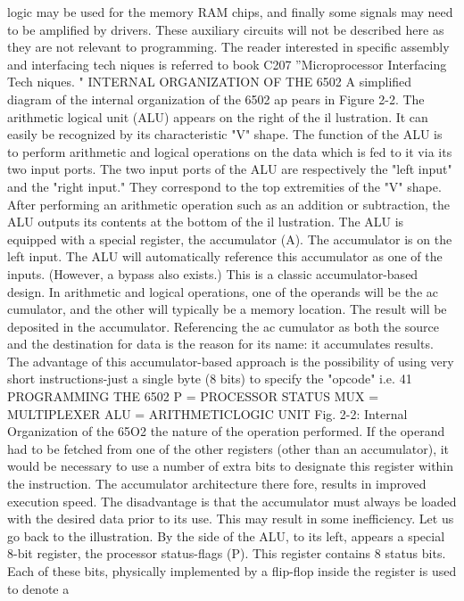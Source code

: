 \documentclass{book}
\begin{document}
logic may be used for the memory RAM chips, and finally some
signals may need to be amplified by drivers. These auxiliary circuits
will not be described here as they are not relevant to programming.
The reader interested in specific assembly and interfacing tech
niques is referred to book C207 ''Microprocessor Interfacing Tech
niques. "
INTERNAL ORGANIZATION OF THE 6502
A simplified diagram of the internal organization of the 6502 ap
pears in Figure 2-2.
The arithmetic logical unit (ALU) appears on the right of the il
lustration. It can easily be recognized by its characteristic "V"
shape. The function of the ALU is to perform arithmetic and logical
operations on the data which is fed to it via its two input ports. The
two input ports of the ALU are respectively the "left input" and the
"right input." They correspond to the top extremities of the "V"
shape. After performing an arithmetic operation such as an addition
or subtraction, the ALU outputs its contents at the bottom of the il
lustration.
The ALU is equipped with a special register, the accumulator (A).
The accumulator is on the left input. The ALU will automatically
reference this accumulator as one of the inputs. (However, a bypass
also exists.) This is a classic accumulator-based design. In
arithmetic and logical operations, one of the operands will be the ac
cumulator, and the other will typically be a memory location.
The result will be deposited in the accumulator. Referencing the ac
cumulator as both the source and the destination for data is the
reason for its name: it accumulates results. The advantage of this
accumulator-based approach is the possibility of using very short
instructions-just a single byte (8 bits) to specify the "opcode" i.e.
41
PROGRAMMING THE 6502
P = PROCESSOR
STATUS
MUX = MULTIPLEXER
ALU = ARITHMETICLOGIC
UNIT
Fig. 2-2: Internal Organization of the 65O2
the nature of the operation performed. If the operand had to be
fetched from one of the other registers (other than an accumulator),
it would be necessary to use a number of extra bits to designate this
register within the instruction. The accumulator architecture there
fore, results in improved execution speed. The disadvantage is that
the accumulator must always be loaded with the desired data prior
to its use. This may result in some inefficiency.
Let us go back to the illustration. By the side of the ALU, to its
left, appears a special 8-bit register, the processor status-flags (P).
This register contains 8 status bits. Each of these bits, physically
implemented by a flip-flop inside the register is used to denote a
\end{document}
